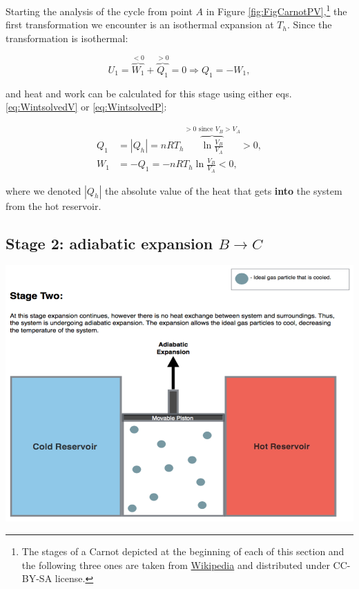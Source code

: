 \documentclass[
]{book}
\theoremstyle{definition}
\theoremstyle{definition}
\theoremstyle{definition}
\theoremstyle{remark}
\begin{document}
Starting the analysis of the cycle from point \(A\) in Figure \ref{fig:FigCarnotPV},\footnote{The stages of a Carnot depicted at the beginning of each of this section and the following three ones are taken from \href{https://en.wikipedia.org/wiki/Carnot_cycle}{Wikipedia} and distributed under CC-BY-SA license.} the first transformation we encounter is an isothermal expansion at \(T_h\). Since the transformation is isothermal:

\begin{equation}
U_1 = \overbrace{W_1}^{<0} + \overbrace{Q_1}^{>0} = 0 \Rightarrow Q_1 = -W_1,
  \label{eq:CCst1}
\end{equation}

and heat and work can be calculated for this stage using either eqs. \eqref{eq:WintsolvedV} or \eqref{eq:WintsolvedP}:

\begin{equation}
\begin{aligned}
 Q_1 & = \left| Q_h \right|  = nRT_h \overbrace{\ln \frac{V_B}{V_A}}^{>0 \text{ since } V_B>V_A} > 0, \\
 W_1 & = -Q_1 = - nRT_h \ln \frac{V_B}{V_A} < 0,
\end{aligned}
  \label{eq:CCst1b}
\end{equation}

where we denoted \(\left| Q_h \right|\) the absolute value of the heat that gets \textbf{into} the system from the hot reservoir.

\hypertarget{CCstage2}{%
\subsection{\texorpdfstring{Stage 2: adiabatic expansion \(B \rightarrow C\)}{Stage 2: adiabatic expansion B \textbackslash rightarrow C}}\label{CCstage2}}

\begin{center}\includegraphics[width=0.7\linewidth]{./img/OEP_Figures.007b} \end{center}
\end{document}
